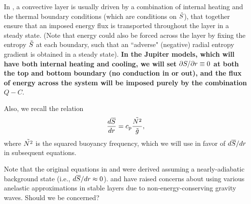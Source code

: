 \documentclass[12pt]{article}
\numberwithin{equation}{section}
\begin{document}
	In {\rayleigh}, a convective layer is usually driven by a combination of internal heating and the thermal boundary conditions (which are conditions on $\tilde{S}$), that together ensure that an imposed energy flux is transported throughout the layer in a steady state. (Note that energy could also be forced across the layer by fixing the entropy $\tilde{S}$ at each boundary, such that an ``adverse" (negative) radial entropy gradient is obtained in a steady state).   \textbf{In the Jupiter models, which will have both internal heating and cooling, we will set $\partial S/\partial r\equiv0$ at both the top and bottom boundary (no conduction in or out), and the flux of energy across the system will be imposed purely by the combination $Q-C$}. 
	
	
	Also, we recall the relation
	\begin{align}
		\frac{d\overline{S}}{dr} = c_{\rm{p}} \frac{\tilde{N^2}}{\tilde{g}},
	\end{align}
	where $\tilde{N^2}$ is the squared buoyancy frequency, which we will use in favor of $d\overline{S}/dr$ in subsequent equations. 
	
	Note that the original equations in \citet{Gilman1981} and \citet{Clune1999} were derived assuming a nearly-adiabatic background state (i.e., $d\overline{S}/dr\approx0$). \citet{Brown2012} and \citet{Vasil2013} have raised concerns about using various anelastic approximations in stable layers due to non-energy-conserving gravity waves. Should we be concerned?
	
\end{document}
